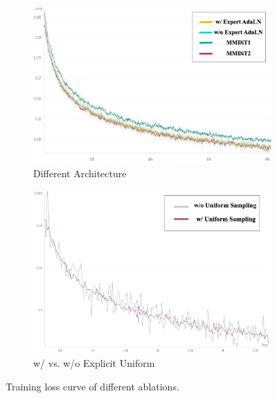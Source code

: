 \begin{figure}[H]
\begin{subfigure}[b]{0.34\textwidth}
        \includegraphics[width=\textwidth]{images/ab_ex.png}
        \caption{Different Architecture}
        \label{fig:loss-expert}
    \end{subfigure}
    \begin{subfigure}[b]{0.34\textwidth}
        \includegraphics[width=\textwidth]{images/ab_us.png}
        \caption{\small{w/ vs. w/o Explicit Uniform}}
        \label{fig:loss-uniform-sampling}
    \end{subfigure}

    \caption{Training loss curve of different ablations.}
    \label{fig:subfigures}
    \vspace{-1em}
\end{figure}